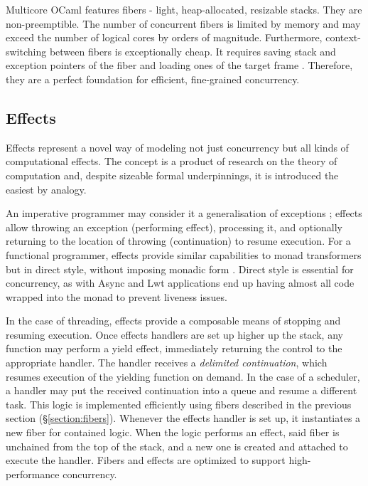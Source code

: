 \documentclass[12pt,a4paper,twoside]{report}
\begin{document}
Multicore OCaml features fibers - light, heap-allocated, resizable stacks. They are non-preemptible. The number of concurrent fibers is limited by memory and may exceed the number of logical cores by orders of magnitude. Furthermore, context-switching between fibers is exceptionally cheap. It requires saving stack and exception pointers of the fiber and loading ones of the target frame \cite{Sivaramakrishnan2021}. Therefore, they are a perfect foundation for efficient, fine-grained concurrency. 

\subsection{Effects}
\label{section:effects}
Effects represent a novel way of modeling not just concurrency but all kinds of computational effects. The concept is a product of research on the theory of computation \cite{Pretnar2015} and, despite sizeable formal underpinnings, it is introduced the easiest by analogy. 

An imperative programmer may consider it a generalisation of exceptions \cite{Brachthuser2020}; effects allow throwing an exception (performing effect), processing it, and optionally returning to the location of throwing (continuation) to resume execution. For a functional programmer, effects provide similar capabilities to monad transformers but in direct style, without imposing monadic form \cite{Sivaramakrishnan2021}. Direct style is essential for concurrency, as with Async and Lwt applications end up having almost all code wrapped into the monad to prevent liveness issues.  

In the case of threading, effects provide a composable means of stopping and resuming execution. Once effects handlers are set up higher up the stack, any function may perform a yield effect, immediately returning the control to the appropriate handler. The handler receives a \textit{delimited continuation}, which resumes execution of the yielding function on demand. In the case of a scheduler, a handler may put the received continuation into a queue and resume a different task. This logic is implemented efficiently using fibers described in the previous section (\S\ref{section:fibers}). Whenever the effects handler is set up, it instantiates a new fiber for contained logic. When the logic performs an effect, said fiber is unchained from the top of the stack, and a new one is created and attached to execute the handler. Fibers and effects are optimized to support high-performance concurrency. 
\end{document}
